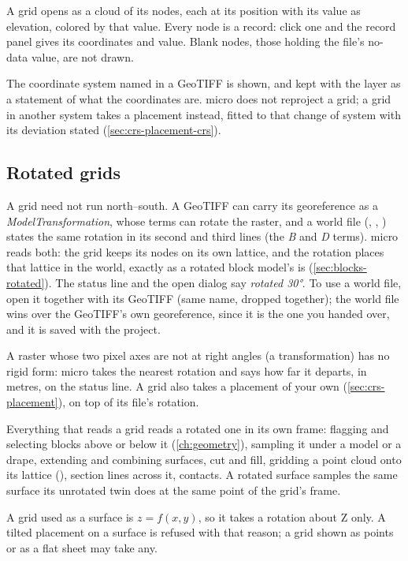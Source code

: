 A grid opens as a cloud of its nodes, each at its position with its value as elevation, colored by that value. Every node is a record: click one and the record panel gives its coordinates and value. Blank nodes, those holding the file's no-data value, are not drawn.

The coordinate system named in a GeoTIFF is shown, and kept with the layer as a statement of what the coordinates are. micro does not reproject a grid; a grid in another system takes a placement instead, fitted to that change of system with its deviation stated (\cref{sec:crs-placement-crs}).

\subsection{Rotated grids}\label{sec:grids-rotated}

A grid need not run north–south. A GeoTIFF can carry its georeference as a \emph{ModelTransformation}, whose terms can rotate the raster, and a world file (, , ) states the same rotation in its second and third lines (the \emph{B} and \emph{D} terms). micro reads both: the grid keeps its nodes on its own lattice, and the rotation places that lattice in the world, exactly as a rotated block model's is (\cref{sec:blocks-rotated}). The status line and the open dialog say \emph{rotated 30°}. To use a world file, open it together with its GeoTIFF (same name, dropped together); the world file wins over the GeoTIFF's own georeference, since it is the one you handed over, and it is saved with the project.

A raster whose two pixel axes are not at right angles (a  transformation) has no rigid form: micro takes the nearest rotation and says how far it departs, in metres, on the status line. A grid also takes a placement of your own (\cref{sec:crs-placement}), on top of its file's rotation.

Everything that reads a grid reads a rotated one in its own frame: flagging and selecting blocks above or below it (\cref{ch:geometry}), sampling it under a model or a drape, extending and combining surfaces, cut and fill, gridding a point cloud onto its lattice (), section lines across it, contacts. A rotated surface samples the same surface its unrotated twin does at the same point of the grid's frame.

A grid used as a surface is $z = f(x, y)$, so it takes a rotation about Z only. A tilted placement on a surface is refused with that reason; a grid shown as points or as a flat sheet may take any.


